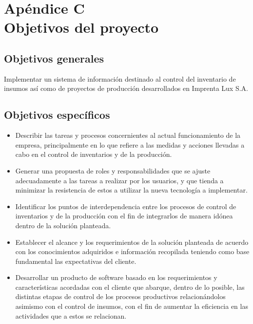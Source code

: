 \documentclass[a4paper, 12pt,twoside]{report}  %
\numberwithin{equation}{subsection} %
\begin{document}
\chapter*{\hypertarget{apendice_c}{}Apéndice C\\Objetivos del proyecto}

\appendix
\renewcommand{\thesection}{C.\arabic{section}}

\section{Objetivos generales}
\label{objetivos_generales}
Implementar un sistema de información destinado al control del inventario de insumos así como de proyectos de producción desarrollados en Imprenta Lux S.A.

\section{Objetivos específicos}
\label{objetivos_especificos}
\begin{itemize}
	\item Describir las tareas y procesos concernientes al actual funcionamiento de la empresa, principalmente en lo que refiere a las medidas y acciones llevadas a cabo en el control de inventarios y de la producción.
	\item Generar una propuesta de roles y responsabilidades que se ajuste adecuadamente a las tareas a realizar por los usuarios, y que tienda a minimizar la resistencia de estos a utilizar la nueva tecnología a implementar.
	\item Identificar los puntos de interdependencia entre los procesos de control de inventarios y de la producción con el fin de integrarlos de manera idónea dentro de la solución planteada.
	\item Establecer el alcance y los requerimientos de la solución planteada de acuerdo con los conocimientos adquiridos e información recopilada teniendo como base fundamental las expectativas del cliente.
	\item Desarrollar un producto de software basado en los requerimientos y características acordadas con el cliente que abarque, dentro de lo posible, las distintas etapas de control de los procesos productivos relacionándolos asimismo con el control de insumos, con el fin de aumentar la eficiencia en las actividades que a estos se relacionan.
\end{itemize}
\end{document}
